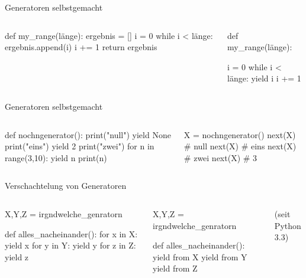 \documentclass[xcolor=dvipsnames, aspectratio=169, 14pt]{beamer}
\begin{document}
\begin{frame}[fragile]{Generatoren selbstgemacht}
	\begin{columns}%
	\vspace{-\baselineskip}
	\begin{python3code}
	def my_range(länge):
		ergebnis = []
		i = 0
		while i < länge:
			ergebnis.append(i)
			i += 1
		return ergebnis
	\end{python3code}
	
	\vspace{-\baselineskip}
	\begin{python3code}
	def my_range(länge):
		
		i = 0
		while i < länge:
			yield i
			i += 1
		
	\end{python3code}
	\end{columns}
\end{frame}

\begin{frame}[fragile]{Generatoren selbstgemacht}
	\begin{columns}%
	\column{0.5\linewidth}
	\vspace{-\baselineskip}
	\begin{python3code}
	def nochngenerator():
		print("null")
		yield None
		print("eins")
		yield 2
		print("zwei")
		for n in range(3,10):
			yield n
			print(n)
	\end{python3code}
	
	\column{0.5\linewidth}
	\vspace{-\baselineskip}
	\begin{python3code}
	X = nochngenerator()
	next(X)
	# null
	next(X)
	# eins
	next(X)
	# zwei
	next(X)
	# 3
	\end{python3code}
	\end{columns}
\end{frame}

\begin{frame}[fragile]{Verschachtelung von Generatoren}
	\begin{columns}%
	\column[t]{0.5\linewidth}
	\vspace{-\baselineskip}
	\begin{python3code}
	X,Y,Z = irgndwelche_genratorn
	
	def alles_nacheinander():
		for x in X:
			yield x
		for y in Y:
			yield y
		for z in Z:
			yield z
	\end{python3code}
	
	\column[t]{0.5\linewidth}
	\vspace{-\baselineskip}
	\begin{python3code}
	X,Y,Z = irgndwelche_genratorn
	
	def alles_nacheinander():
		yield from X
		yield from Y
		yield from Z
	\end{python3code}
	
	(seit Python 3.3)
	\end{columns}
\end{frame}
\end{document}
